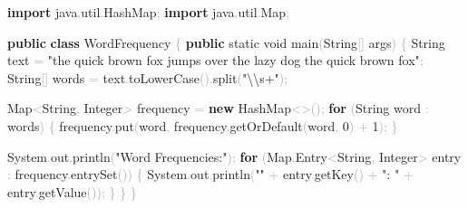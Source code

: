 \documentclass[
  justified,
  openright,
]{tufte-book}
\newcommand{\KeywordTok}[1]{\textcolor{CodeKeyword}{\textbf{#1}}}  %
\newcommand{\StringTok}[1]{\textcolor{CodeString}{#1}}              %
\newcommand{\CodeNumTok}[1]{\textcolor{CodeNumber}{#1}}             %
\newcommand{\CodeFuncTok}[1]{\textcolor{CodeKeyword}{#1}}           %
\newcommand{\CodeTypeTok}[1]{\textcolor{CodeType}{#1}}              %
\newcommand{\CodeAccentTok}[1]{\textcolor{CodeAccent}{#1}}          %
\newcommand{\OperatorTok}[1]{\textcolor{DarkGray}{#1}}              %
\newenvironment{Shaded}{%
  \begin{mdframed}[style=TufteCode]%
}{%
  \end{mdframed}%
}
\begin{document}
\begin{Shaded}
\begin{Highlighting}[]
\KeywordTok{import} \CodeAccentTok{java}\OperatorTok{.}\CodeAccentTok{util}\OperatorTok{.}\CodeAccentTok{HashMap}\OperatorTok{;}
\KeywordTok{import} \CodeAccentTok{java}\OperatorTok{.}\CodeAccentTok{util}\OperatorTok{.}\CodeAccentTok{Map}\OperatorTok{;}
 
\KeywordTok{public} \KeywordTok{class} WordFrequency \OperatorTok{\{}
    \KeywordTok{public} \CodeTypeTok{static} \CodeTypeTok{void} \CodeFuncTok{main}\OperatorTok{(}String\OperatorTok{[]} args\OperatorTok{)} \OperatorTok{\{}
        String text \OperatorTok{=} \StringTok{"the quick brown fox jumps over the lazy dog the quick brown fox"}\OperatorTok{;}
        String\OperatorTok{[]} words \OperatorTok{=} text\OperatorTok{.}\CodeFuncTok{toLowerCase}\OperatorTok{().}\CodeFuncTok{split}\OperatorTok{(}\StringTok{"}\StringTok{\textbackslash{}\textbackslash{}}\StringTok{s+"}\OperatorTok{);}
 
        Map\OperatorTok{\textless{}}String\OperatorTok{,} Integer\OperatorTok{\textgreater{}} frequency \OperatorTok{=} \KeywordTok{new} HashMap\OperatorTok{\textless{}\textgreater{}();}
        \KeywordTok{for} \OperatorTok{(}String word \OperatorTok{:} words\OperatorTok{)} \OperatorTok{\{}
            frequency\OperatorTok{.}\CodeFuncTok{put}\OperatorTok{(}word\OperatorTok{,} frequency\OperatorTok{.}\CodeFuncTok{getOrDefault}\OperatorTok{(}word\OperatorTok{,} \CodeNumTok{0}\OperatorTok{)} \OperatorTok{+} \CodeNumTok{1}\OperatorTok{);}
        \OperatorTok{\}}
 
        System\OperatorTok{.}\CodeFuncTok{out}\OperatorTok{.}\CodeFuncTok{println}\OperatorTok{(}\StringTok{"Word Frequencies:"}\OperatorTok{);}
        \KeywordTok{for} \OperatorTok{(}Map\OperatorTok{.}\CodeFuncTok{Entry}\OperatorTok{\textless{}}String\OperatorTok{,} Integer\OperatorTok{\textgreater{}} entry \OperatorTok{:} frequency\OperatorTok{.}\CodeFuncTok{entrySet}\OperatorTok{())} \OperatorTok{\{}
            System\OperatorTok{.}\CodeFuncTok{out}\OperatorTok{.}\CodeFuncTok{println}\OperatorTok{(}\StringTok{"\textquotesingle{}"} \OperatorTok{+} entry\OperatorTok{.}\CodeFuncTok{getKey}\OperatorTok{()} \OperatorTok{+} \StringTok{"\textquotesingle{}: "} \OperatorTok{+} entry\OperatorTok{.}\CodeFuncTok{getValue}\OperatorTok{());}
        \OperatorTok{\}}
    \OperatorTok{\}}
\OperatorTok{\}}
\end{Highlighting}
\end{Shaded}
\end{document}
